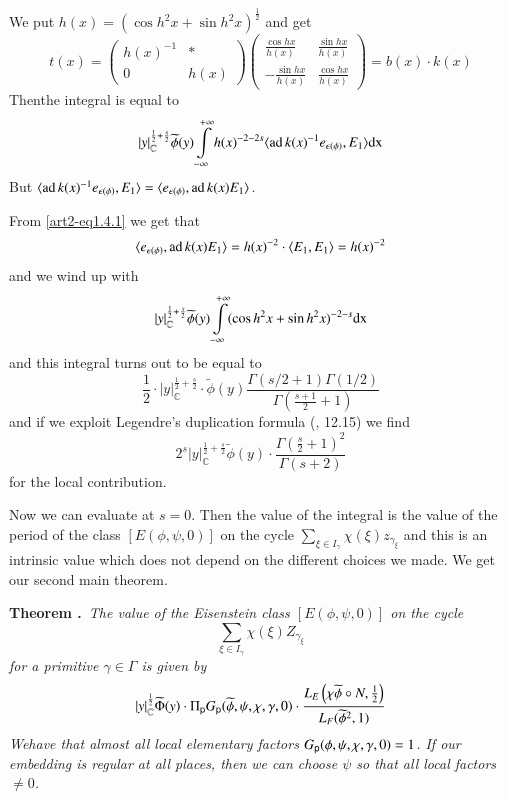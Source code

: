 We put $h(x)=(\cos h^{2}x+\sin h^{2}x)^{\frac{1}{2}}$ and get
$$
t(x)=\left(\begin{matrix}
h(x)^{-1} & *\\
0 & h(x)
\end{matrix}\right)
\left(\begin{matrix}
\frac{\cos hx}{h(x)} & \frac{\sin hx}{h(x)}\\[4pt]
-\frac{\sin hx}{h(x)} & \frac{\cos hx}{h(x)}
\end{matrix}\right)
=b(x)\cdot k(x)
$$
Then\pageoriginale the integral is equal to
$$
|y|^{\frac{1}{2}+\frac{s}{2}}_{\mathbb{C}}\widetilde{\phi}(y)\int\limits^{+\infty}_{-\infty}h(x)^{-2-2s}\langle \operatorname{ad} k(x)^{-1}e_{\epsilon(\phi)},E_{1}\rangle \mathrm{dx}
$$
But $\langle \operatorname{ad} k(x)^{-1}e_{\epsilon(\phi)},E_{1}\rangle=\langle e_{\epsilon(\phi)},\operatorname{ad} k(x)E_{1}\rangle$.

From \eqref{art2-eq1.4.1} we get that
$$
\langle e_{\epsilon(\phi)},\operatorname{ad} k(x)E_{1}\rangle =h(x)^{-2}\cdot \langle E_{1},E_{1}\rangle =h(x)^{-2}
$$
and we wind up with
$$
|y|^{\frac{1}{2}+\frac{s}{2}}_{\mathbb{C}}\widetilde{\phi}(y)\int\limits^{+\infty}_{-\infty}(\cos h^{2}x+\sin h^{2}x)^{-2-s}\mathrm{dx}
$$
and this integral turns out to be equal to
$$
\frac{1}{2}\cdot |y|^{\frac{1}{2}+\frac{s}{2}}_{\mathbb{C}}\cdot \widetilde{\phi}(y)\dfrac{\Gamma(s/2+1)\Gamma(1/2)}{\Gamma\left(\frac{s+1}{2}+1\right)}
$$
and if we exploit Legendre's duplication formula (\cite{art2-key28}, 12.15) we find
$$
2^{s}|y|^{\frac{1}{2}+\frac{s}{2}}_{\mathbb{C}}\widetilde{\phi}(y)\cdot \frac{\Gamma\left(\frac{s}{2}+1\right)^{2}}{\Gamma(s+2)}
$$
for the local contribution.

\vfill\eject

Now we can evaluate at $s=0$. Then the value of the integral is the value of the period of the class $[E(\phi,\psi,0)]$ on the cycle $\sum\limits_{\xi\in I_{\gamma}}\chi(\xi)z_{\gamma_{\xi}}$ and this is an intrinsic value which does not depend on the different choices we made. We get our second main theorem.

\medskip
\noindent
{\bf Theorem .\label{art2-thm3.1.6}}~{\em The value of the Eisenstein class $[E(\phi,\psi,0)]$ on the cycle}
$$
\sum\limits_{\xi\in I_{\gamma}}\chi(\xi)Z_{\gamma_{\xi}}
$$
{\em for a primitive $\gamma\in \Gamma$ is given by}
$$
|y|^{\frac{1}{2}}_{\mathbb{C}}\widetilde{\Phi}(y)\cdot \Pi_{\mathsf{p}}G_{\mathsf{p}}(\widetilde{\phi},\psi,\chi,\gamma,0)\cdot \dfrac{L_{E}\left(\chi\widetilde{\phi}\circ N,\frac{1}{2}\right)}{L_{F}(\widetilde{\phi}^{2},1)}
$$
{\em We\pageoriginale have that almost all local elementary factors $G_{\mathsf{p}}(\phi,\psi,\chi,\gamma,0)=1$. If our embedding is regular at all places, then we can choose $\psi$ so that all local factors $\neq 0$.}

